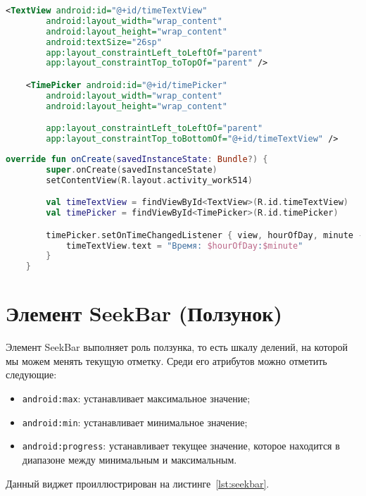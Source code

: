 \begin{lstlisting}[language=xml, caption=\leftline{timepicker XML}, label=lst:timepicker]
<TextView android:id="@+id/timeTextView"
        android:layout_width="wrap_content"
        android:layout_height="wrap_content"
        android:textSize="26sp"
        app:layout_constraintLeft_toLeftOf="parent"
        app:layout_constraintTop_toTopOf="parent" />

    <TimePicker android:id="@+id/timePicker"
        android:layout_width="wrap_content"
        android:layout_height="wrap_content"

        app:layout_constraintLeft_toLeftOf="parent"
        app:layout_constraintTop_toBottomOf="@+id/timeTextView" />
\end{lstlisting}

\begin{lstlisting}[language=Kotlin, caption=\leftline{timepicker Kotlin}, label=lst:timepickerKotlin]
override fun onCreate(savedInstanceState: Bundle?) {
        super.onCreate(savedInstanceState)
        setContentView(R.layout.activity_work514)

        val timeTextView = findViewById<TextView>(R.id.timeTextView)
        val timePicker = findViewById<TimePicker>(R.id.timePicker)

        timePicker.setOnTimeChangedListener { view, hourOfDay, minute ->
            timeTextView.text = "Время: $hourOfDay:$minute"
        }
    }
\end{lstlisting}


\section{Элемент SeekBar (Ползунок)}
Элемент SeekBar выполняет роль ползунка, то есть шкалу делений, на 
которой мы можем менять текущую отметку. Среди его атрибутов можно 
отметить следующие:

\begin{itemize}
	\item \texttt{android:max}: устанавливает максимальное значение;
	\item \texttt{android:min}: устанавливает минимальное значение;
	\item \texttt{android:progress}: устанавливает текущее значение,
		которое находится в диапазоне между минимальным и максимальным.
\end{itemize}

Данный виджет проиллюстрирован на листинге~\ref{lst:seekbar}.

